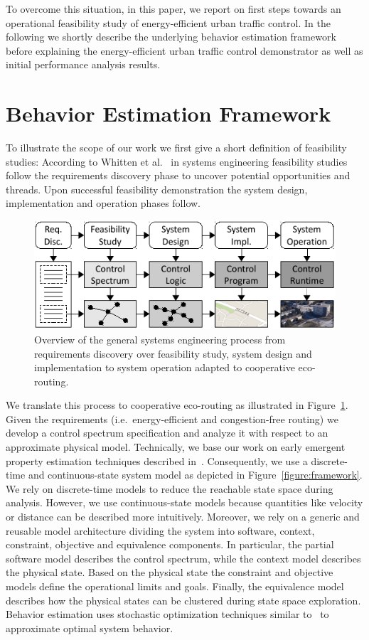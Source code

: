 \documentclass[conference]{../cls/IEEEtran}
\begin{document}
To overcome this situation, in this paper, we report on first steps towards an
operational feasibility study of energy-efficient urban traffic control.
In the following we shortly describe the underlying behavior estimation
framework before explaining the energy-efficient urban traffic control demonstrator as well as initial performance analysis results.

\section{Behavior Estimation Framework}

To illustrate the scope of our work we first give a short definition of feasibility studies: 
According to Whitten et al.~\cite{Whitten2005} in systems engineering feasibility studies follow the requirements discovery phase to uncover potential opportunities and threads.
Upon successful feasibility demonstration the system design, implementation and operation phases follow.

\begin{figure}[b]
	\centering
	\includegraphics{../gfx/process.pdf}
	\caption{Overview of the general systems engineering process from requirements discovery over feasibility study, system design and implementation to system operation adapted to cooperative eco-routing.}
	\label{figure:process}
\end{figure}
We translate this process to cooperative eco-routing as illustrated in Figure~\ref{figure:process}.
Given the requirements (i.e.\ energy-efficient and congestion-free routing) we develop a control spectrum specification and analyze it with respect to an approximate physical model.
Technically, we base our work on early emergent property estimation techniques described in~\cite{Hackenberg2012}.
Consequently, we use a discrete-time and continuous-state system model as depicted in Figure~\ref{figure:framework}.
We rely on discrete-time models to reduce the reachable state space during analysis.
However, we use continuous-state models because quantities like velocity or distance can be described more intuitively.
Moreover, we rely on a generic and reusable model architecture dividing the system into software, context, constraint, objective and equivalence components.
In particular, the partial software model describes the control spectrum, while the context model describes the physical state.
Based on the physical state the constraint and objective models define the operational limits and goals.
Finally, the equivalence model describes how the physical states can be clustered during state space exploration.
Behavior estimation uses stochastic optimization techniques similar to~\cite{Pereira1991} to approximate optimal system behavior.
\end{document}
